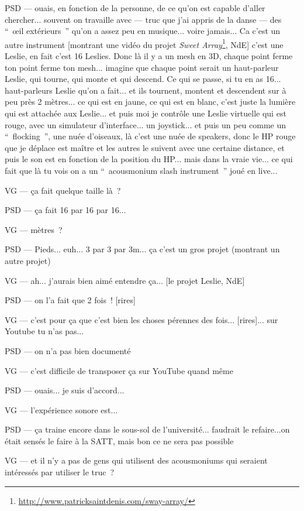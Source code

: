 PSD — ouais, en fonction de la personne, de ce qu'on est capable d'aller chercher... souvent on travaille avec — truc que j'ai appris de la danse — des “ œil extérieurs ” qu'on a assez peu en musique... voire jamais... Ca c'est un autre instrument [montrant une vidéo du projet \textit{Sweet Array}\footnote{\url{http://www.patricksaintdenis.com/sway-array/}},  NdE] c'est une Leslie, en fait c'est 16 Leslies. Donc là il y a un mesh en 3D, chaque point ferme ton point ferme ton mesh... imagine que chaque point serait un haut-parleur Leslie, qui tourne, qui monte et qui descend. Ce qui se passe, si tu en as 16... haut-parleurs Leslie qu'on a fait... et ils tournent, montent et descendent sur à peu près 2 mètres... ce qui est en jaune, ce qui est en blanc, c'est juste la lumière qui est attachée aux Leslie... et puis moi je contrôle une Leslie virtuelle qui est rouge, avec un simulateur d'interface... un joystick... et puis un peu comme un “ flocking ”, une nuée d'oiseaux, là c'est une nuée de speakers, donc le HP rouge que je déplace est maître et les autres le suivent avec une certaine distance, et puis le son est en fonction de la position du HP... mais dans la vraie vie... ce qui fait que là tu vois on a un “ acousmonium slash instrument ” joué en live... 

VG — ça fait quelque taille là ?

PSD — ça fait 16 par 16 par 16... 

VG — mètres ?

PSD — Pieds... euh... 3 par 3 par 3m... ça c'est un gros projet (montrant un autre projet)

VG — ah... j'aurais bien aimé entendre ça... [le projet Leslie,  NdE]

PSD — on l'a fait que 2 fois ! [rires]

VG — c'est pour ça que c'est bien les choses pérennes des fois... [rires]... sur Youtube tu n'as pas...

PSD — on n'a pas bien documenté

VG — c'est difficile de transposer ça sur YouTube quand même

PSD — ouais... je suis d'accord...

VG — l'expérience sonore est...

PSD — ça traine encore dans le sous-sol de l'université... faudrait le refaire...on était sensés le faire à la SATT, mais bon ce ne sera pas possible

VG — et il n'y a pas de gens qui utilisent des acousmoniums qui seraient intéressés par utiliser le truc ?

